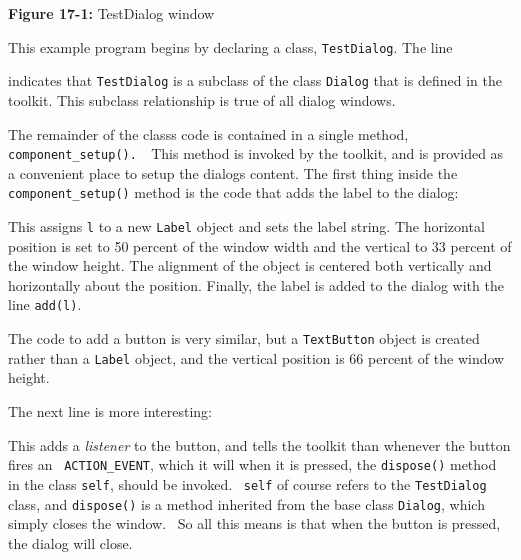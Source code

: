 {\sffamily\bfseries Figure 17-1:}
{\sffamily TestDialog window}

\bigskip

This example program begins by
declaring a class, \texttt{TestDialog}. The line


\noindent
indicates that \texttt{TestDialog} is a subclass of the
class \texttt{Dialog} that is defined in the toolkit. This subclass
relationship is true of all dialog windows. 

The remainder of the class{\textquotesingle}s code is contained in a
single method, \texttt{component\_setup(). \ }This method is invoked by
the toolkit, and is provided as a convenient place to setup the
dialog{\textquotesingle}s content. The first thing inside the
\texttt{component\_setup()} method is the code that adds the label to
the dialog: 


\noindent This assigns \texttt{l} to a new \texttt{Label} object
and sets the label string. The horizontal position is set to 50 percent of
the window width and the vertical to 33 percent of the window height.
The alignment of the object is centered both vertically and
horizontally about the position. Finally, the label is added to the
dialog with the line \texttt{add(l)}.

The code to add a button is very similar, but a \texttt{TextButton}
object is created rather than a \texttt{Label} object, and the vertical
position is 66 percent of the window height. 

The next line is more interesting:


\noindent This adds a \textit{listener} to the button, and tells the toolkit
than whenever the button fires an \ \texttt{ACTION\_EVENT}, which it will
when it is pressed, the \texttt{dispose()} method in the class
\texttt{self}, should be invoked. \ \texttt{self} of course refers to
the \texttt{TestDialog} class, and \texttt{dispose()} is a method
inherited from the base class \texttt{Dialog}, which simply closes the
window. \ So all this means is that when the button is pressed, the
dialog will close.

